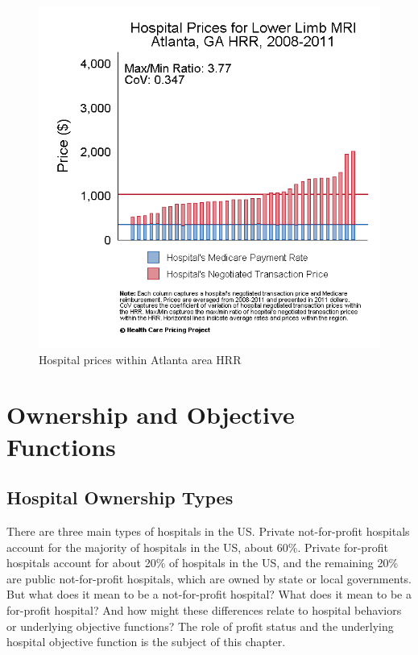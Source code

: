 \documentclass[
  letterpaper,
  DIV=11,
  numbers=noendperiod]{scrreport}
\theoremstyle{definition}
\theoremstyle{remark}
\begin{document}
\begin{figure}
\begin{minipage}[t]{0.50\linewidth}
{{\includegraphics{part3/../figures/HC_var_withinmkt_kmri_ga_atlanta.png}

}

}

\end{minipage}%

\caption{\label{fig-prices-market}Hospital prices within Atlanta area
HRR}

\end{figure}

\hypertarget{ownership-and-objective-functions}{%
\chapter{Ownership and Objective
Functions}\label{ownership-and-objective-functions}}

\hypertarget{hospital-ownership-types}{%
\section{Hospital Ownership Types}\label{hospital-ownership-types}}

There are three main types of hospitals in the US. Private
not-for-profit hospitals account for the majority of hospitals in the
US, about 60\%. Private for-profit hospitals account for about 20\% of
hospitals in the US, and the remaining 20\% are public not-for-profit
hospitals, which are owned by state or local governments. But what does
it mean to be a not-for-profit hospital? What does it mean to be a
for-profit hospital? And how might these differences relate to hospital
behaviors or underlying objective functions? The role of profit status
and the underlying hospital objective function is the subject of this
chapter.
\end{document}
